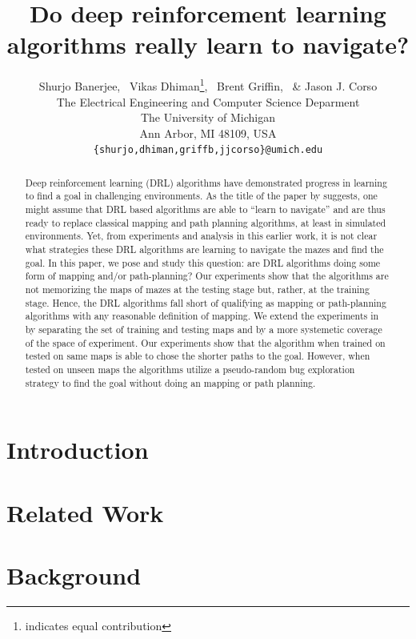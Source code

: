 \documentclass{article} %
\title{Do deep reinforcement learning algorithms really learn to navigate?}
\author{Shurjo Banerjee\footnotemark[1],%
  \, Vikas Dhiman\thanks{indicates equal contribution},%
  \, Brent Griffin,%
  \, \& Jason J. Corso\\
  The Electrical Engineering and Computer Science Deparment\\
The University of Michigan\\
Ann Arbor, MI 48109, USA \\
\texttt{\{shurjo,dhiman,griffb,jjcorso\}@umich.edu} \\
}
\begin{document}
\maketitle
\begin{abstract}
  Deep reinforcement learning (DRL) algorithms have demonstrated progress in learning to find a goal in challenging environments.
  As the title of the paper by \cite{MiPaViICLR2017} suggests, one might assume that DRL based algorithms are able to ``learn to navigate'' and are thus ready to replace classical mapping and path planning algorithms, at least in simulated environments.
  Yet, from experiments and analysis in this earlier work, it is not clear what strategies these DRL algorithms are learning to navigate the mazes and find the goal.
  In this paper, we pose and study this question: are DRL algorithms doing some form of mapping and/or path-planning?  Our experiments show that the algorithms are not memorizing the maps of mazes at the testing stage but, rather, at the training stage.
  Hence, the DRL algorithms fall short of qualifying as mapping or path-planning algorithms with any reasonable definition of mapping.
  We extend the experiments in \cite{MiPaViICLR2017} by separating the set of training and testing maps and by a more systemetic coverage of the space of experiment.
  Our experiments show that the \NavAiiiCDiDiiL{} algorithm when trained on tested on same maps is able to chose the shorter paths to the goal.
  However, when tested on unseen maps the algorithms utilize a pseudo-random bug exploration strategy to find the goal without doing an mapping or path planning.
\end{abstract}

\section{Introduction}
%


\section{Related Work}


\section{Background}


%
\end{document}
